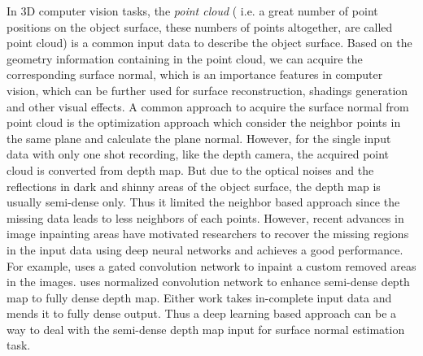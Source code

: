 %
%
%

In 3D computer vision tasks, the \textit{point cloud} ( i.e. a great number of point positions on the object surface, these numbers of points altogether, are called point cloud) is a common input data to describe the object surface. Based on the geometry information containing in the point cloud, we can acquire the corresponding surface normal, which is an importance features in computer vision, which can be further used for  surface reconstruction, shadings generation and other visual effects. A common approach to acquire the surface normal from point cloud is the optimization approach which consider the neighbor points in the same plane and calculate the plane normal. However, for the single input data with only one shot recording, like the depth camera, the acquired point cloud is converted from depth map. But due to the  optical noises and the reflections in dark and shinny areas of the object surface, the depth map is usually semi-dense only. Thus it limited the neighbor based approach since the missing data leads to less neighbors of each points. However, recent advances in image inpainting areas have motivated researchers to recover the missing regions in the input data using deep neural networks and achieves a good performance. For example, \cite{gconv} uses a gated convolution network to inpaint a custom removed areas in the images. \cite{nconv} uses normalized convolution network to enhance semi-dense depth map to fully dense depth map. Either work takes in-complete input data and mends it to fully dense output. Thus a deep learning based approach can be a way to deal with the semi-dense depth map input for surface normal estimation task.

